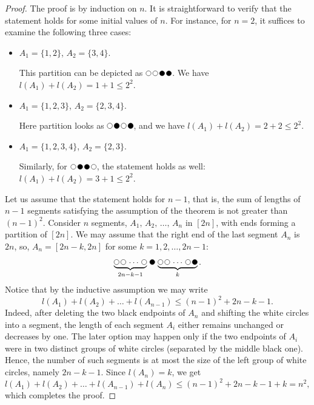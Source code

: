 \documentclass[12pt]{amsart}
\theoremstyle{plain}
\numberwithin{equation}{section}
\newcommand{\tikzcircle}[2][red,fill=red]{\tikz[baseline=-0.75ex]\draw[#1,radius=#2] (0,0) circle ;}
\begin{document}
\begin{proof} 
	The proof is by induction on $n$. It is straightforward to verify that the statement holds for some initial values of $n$. For instance, for $n=2$, it suffices to examine the following three cases:
	
	\begin{itemize}
		\item $A_1=\{1,2\}$, $A_2=\{3,4\}$.
		
		This partition can be depicted as $\tikzcircle[fill=white]{3pt}\,\tikzcircle[fill=white]{3pt}\,\tikzcircle[fill=black]{3pt}\,\tikzcircle[fill=black]{3pt}$. We have $l(A_1)+l(A_2)=1+1\leqslant2^2$.
		
		\item $A_1=\{1,2,3\}$, $A_2=\{2,3,4\}$.
		
		Here partition looks as $\tikzcircle[fill=white]{3pt}\,\tikzcircle[fill=black]{3pt}\,\tikzcircle[fill=white]{3pt}\,\tikzcircle[fill=black]{3pt}$, and we have $l(A_1)+l(A_2)=2+2\leqslant2^2$.
		
		\item $A_1=\{1,2,3,4\}$, $A_2=\{2,3\}$.
		
		Similarly, for $\tikzcircle[fill=white]{3pt}\,\tikzcircle[fill=black]{3pt}\,\tikzcircle[fill=black]{3pt}\,\tikzcircle[fill=white]{3pt}$, the statement holds as well: $l(A_1)+l(A_2)=3+1\leqslant2^2$.
	\end{itemize}
	
	Let us assume that the statement holds for $n-1$, that is, the sum of lengths of $n-1$ segments satisfying the assumption of the theorem is not greater than $(n-1)^2$. Consider $n$ segments, $A_1,\,A_2,\,\ldots,\,A_n$ in $[2n]$, with ends forming a partition of $[2n]$. We may assume that the right end of the last segment $A_n$ is $2n$, so, $A_n=[2n-k,2n]$ for some $k=1,2,\ldots,2n-1$:
	$$\underbrace{\tikzcircle[fill=white]{3pt}\,\tikzcircle[fill=white]{3pt}\,\cdots\,\tikzcircle[fill=white]{3pt}}_{2n-k-1}\,\tikzcircle[fill=black]{3pt}\,\underbrace{\tikzcircle[fill=white]{3pt}\,\tikzcircle[fill=white]{3pt}\,\cdots\,\tikzcircle[fill=white]{3pt}\,\tikzcircle[fill=black]{3pt}}_{k}.$$
	Notice that by the inductive assumption we may write $$l(A_1)+l(A_2)+\ldots+l(A_{n-1})\leqslant (n-1)^2+2n-k-1.$$ Indeed, after deleting the two black endpoints of $A_n$ and shifting the white circles into a segment, the length of each segment $A_i$ either remains unchanged or decreases by one. The later option may happen only if the two endpoints of $A_i$ were in two distinct groups of white circles (separated by the middle black one). Hence, the number of such segments is at most the size of the left group of white circles, namely $2n-k-1$. Since $l(A_n)=k$, we get
	$$l(A_1)+l(A_2)+\ldots+l(A_{n-1})+l(A_n)\leqslant (n-1)^2+2n-k-1+k=n^2,$$
	which completes the proof.
\end{proof}
\end{document}
